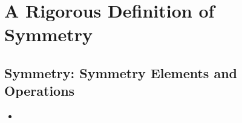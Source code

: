 \documentclass[../notes.tex]{subfiles}
\begin{document}
\chapter{A Rigorous Definition of Symmetry}
\section{Symmetry: Symmetry Elements and Operations}
\begin{itemize}
    \item {}
\end{itemize}
\end{document}
